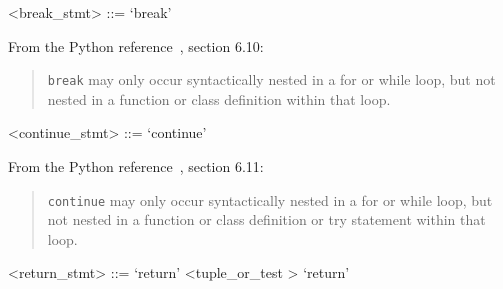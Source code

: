 \label{breakzzzstmtb}

\begin{grammar}
<break_stmt> ::= `break'
\end{grammar}


From the Python reference~\cite{pythonlang}, section 6.10:
\begin{quote}
\verb+break+ may only occur syntactically nested in a for or while loop, 
but not nested in a function or class definition within that loop.
\end{quote}

\label{continuezzzstmtb}

\begin{grammar}
<continue_stmt> ::= `continue'
\end{grammar}


From the Python reference~\cite{pythonlang}, section 6.11:
\begin{quote}
\verb|continue| may only occur syntactically nested in a for or while loop, 
but not nested in a function or class definition or try statement within 
that loop.
\end{quote}

\label{returnzzzstmtb}

\begin{grammar}
<return_stmt> ::= `return' <tuple_or_test \myref[tuplezzzorzzztestb]>
	\alt `return'
\end{grammar}


